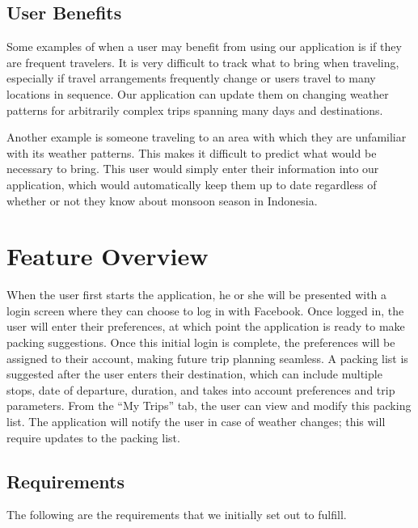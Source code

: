 \documentclass[11pt]{article}
\begin{document}
\subsection{User Benefits}
Some examples of when a user may benefit from using our application is if they are frequent travelers. It is very difficult to track what to bring when traveling, especially if travel arrangements frequently change or users travel to many locations in sequence. Our application can update them on changing weather patterns for arbitrarily complex trips spanning many days and destinations. 

Another example is someone traveling to an area with which they are unfamiliar with its weather patterns. This makes it difficult to predict what would be necessary to bring. This user would simply enter their information into our application, which would automatically keep them up to date regardless of whether or not they know about monsoon season in Indonesia.

\section{Feature Overview} %
    When the user first starts the application, he or she will be presented with a login screen where they can choose to log in with Facebook. Once logged in, the user will enter their preferences, at which point the application is ready to make packing suggestions. Once this initial login is complete, the preferences will be assigned to their account, making future trip planning seamless. A packing list is suggested after the user enters their destination, which can include multiple stops, date of departure, duration, and takes into account preferences and trip parameters. From the ``My Trips'' tab, the user can view and modify this packing list. The application will notify the user in case of weather changes; this will require updates to the packing list.

    \subsection{Requirements}
        The following are the requirements that we initially set out to fulfill. 
\end{document}
